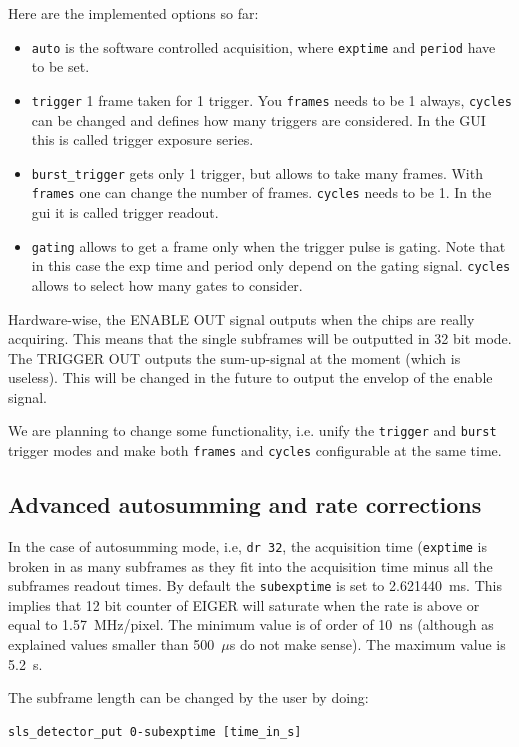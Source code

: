 \documentclass{article}
\newcommand{\E}{EIGER\xspace}
\begin{document}
Here are the implemented options so far:
\begin{itemize}
\item {\tt{auto}} is the software controlled acquisition, where {\tt{exptime}} and {\tt{period}} have to be set.
\item {\tt{trigger}} 1 frame taken for 1 trigger. You {\tt{frames}} needs to be  1 always, {\tt{cycles}} can be changed and defines how many triggers are considered. In the GUI this is called trigger exposure series. 
\item {\tt{burst\_trigger}} gets only 1 trigger, but allows to take many frames. With {\tt{frames}} one can change the number of frames. {\tt{cycles}} needs to be 1. In the gui it is called trigger readout.
\item{\tt{gating}} allows to get a frame only when the trigger pulse is gating. Note that in this case the exp time and period only depend on the gating signal. {\tt{cycles}} allows to select how many gates to consider. 
\end{itemize}

Hardware-wise, the ENABLE OUT signal outputs when the chips are really acquiring. This means that the single subframes will be outputted in 32 bit mode. The TRIGGER OUT outputs the sum-up-signal at the moment (which is useless). This will be changed in the future to output the envelop of the enable signal. 

We are planning to change some functionality, i.e. unify the {\tt{trigger}} and {\tt{burst}} trigger modes and make both {\tt{frames}} and {\tt{cycles}} configurable at the same time.
 

\subsection{Advanced autosumming and rate corrections}

In the case of autosumming mode, i.e, {\tt{dr 32}}, the acquisition time ({\tt{exptime}} is broken in as many subframes as they fit into the acquisition time minus all the subframes readout times. By default the {\tt{subexptime}} is set to 2.621440~ms. This implies that 12 bit counter of \E will saturate when the rate is above or equal to 1.57~MHz/pixel. The minimum value is of order of 10~ns (although as explained values smaller than 500~$\mu$s do not make sense). The maximum value is 5.2~s.

The subframe length can be changed by the user by doing: 
\begin{verbatim}
sls_detector_put 0-subexptime [time_in_s] 
\end{verbatim}
\end{document}
